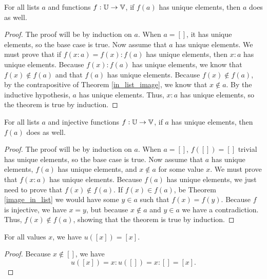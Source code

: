 \documentclass[../../math.tex]{subfiles}
\begin{document}
\begin{theorem} \label{list_image_unique}
    For all lists $a$ and functions $f : \mathbb{U} \to \mathbb{V}$, if $f(a)$ has unique
    elements, then $a$ does as well.
\end{theorem}
\begin{proof}
    The proof will be by induction on $a$.  When $a = []$, it has unique
    elements, so the base case is true.  Now assume that $a$ has unique
    elements.  We must prove that if $f(x : a) = f(x) : f(a)$ has unique
    elements, then $x : a$ has unique elements.  Because $f(x) : f(a)$ has
    unique elements, we know that $f(x) \notin f(a)$ and that $f(a)$ has unique
    elements.  Because $f(x) \notin f(a)$, by the contrapositive of Theorem
    \ref{in_list_image}, we know that $x \notin a$.  By the inductive
    hypothesis, $a$ has unique elements.  Thus, $x : a$ has unique elements, so
    the theorem is true by induction.
\end{proof}

\begin{theorem} \label{list_image_unique_inj}
    For all lists $a$ and injective functions $f : \mathbb{U} \to \mathbb{V}$, if $a$ has unique
    elements, then $f(a)$ does as well.
\end{theorem}
\begin{proof}
    The proof will be by induction on $a$.  When $a = []$, $f([]) = []$ trivial
    has unique elements, so the base case is true.  Now assume that $a$ has
    unique elements, $f(a)$ has unique elements, and $x \notin a$ for some value
    $x$.  We must prove that $f(x : a)$ has unique elements.  Because $f(a)$ has
    unique elements, we just need to prove that $f(x) \notin f(a)$.  If $f(x)
    \in f(a)$, be Theorem \ref{image_in_list} we would have some $y \in a$ such
    that $f(x) = f(y)$.  Because $f$ is injective, we have $x = y$, but because
    $x \notin a$ and $y \in a$ we have a contradiction.  Thus, $f(x) \notin
    f(a)$, showing that the theorem is true by induction.
\end{proof}

\begin{theorem} \label{list_make_unique_single}
    For all values $x$, we have $u([x]) = [x]$.
\end{theorem}
\begin{proof}
    Because $x \notin []$, we have
    \[
        u([x]) = x : u([]) = x : [] = [x].
    \]
\end{proof}
\end{document}
